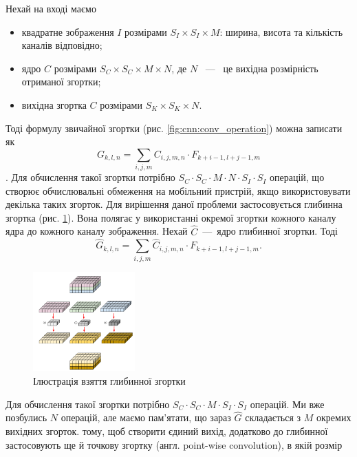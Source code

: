 Нехай на вході маємо
\begin{itemize}
    \item квадратне зображення $I$ розмірами $S_I \times S_I \times M$: ширина, висота та
          кількість каналів відповідно;
    \item ядро $C$ розмірами $S_C \times S_C \times M \times N$, де $N$ ~---~ це вихідна розмірність
          отриманої згортки;
    \item вихідна згортка $C$ розмірами $S_K \times S_K \times N$.
\end{itemize}
Тоді формулу звичайної згортки (рис. \ref{fig:cnn:conv_operation}) можна записати як
\begin{equation*}
    G_{k,l,n} = \sum_{i,j,m} C_{i,j,m,n} \cdot  F_{k+i-1, l+j-1,m}
\end{equation*}.
Для обчислення такої згортки потрібно $S_C \cdot  S_C \cdot  M \cdot  N \cdot  S_I \cdot  S_I$ операцій, що
створює обчислювальні обмеження на мобільний пристрій, якщо використовувати
декілька таких згорток.
Для вирішення даної проблеми застосовується глибинна згортка (рис. \ref{fig:cnn:deep_wise_conv}).
Вона полягає у використанні окремої згортки кожного каналу ядра до кожного каналу
зображення.
Нехай $\widehat{C}$~---~ядро глибинної згортки. Тоді
\begin{equation}
    \widehat{G}_{k,l,n} = \sum_{i,j,m} \widehat{C}_{i,j,m,n} \cdot  F_{k+i-1, l+j-1,m}.
\end{equation}
\begin{figure}[H]
    \centering
    \includegraphics[width=0.35\textwidth]{images/cnn_deep_wise_conv}
    \caption{Ілюстрація взяття глибинної згортки  \cite{deep_wise_sep_conv_website}
        \label{fig:cnn:deep_wise_conv}
    }
\end{figure}
Для обчислення такої згортки потрібно  $S_C \cdot  S_C \cdot  M \cdot  S_I \cdot  S_I$ операцій. Ми вже 
позбулись $N$ операцій, але маємо пам'ятати, що
зараз $\widehat{G}$ складається з $M$ окремих вихідних згорток.
тому, щоб створити єдиний вихід, додатково до глибинної застосовують ще
й точкову згортку (англ. point-wise convolution), в якій розмір
